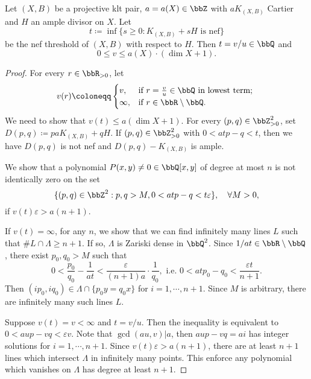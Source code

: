     \begin{theorem}\label{thm: rationality theorem}
        Let \((X,B)\) be a projective klt pair, \(a = a(X) \in \bbZ\) with \(aK_{(X,B)}\) Cartier and \(H\) an ample divisor on \(X\).
        Let 
        \[ t \coloneqq \inf \{s \geq 0: K_{(X,B)} + sH \text{ is nef}\} \]
        be the nef threshold of \((X,B)\) with respect to \(H\).
        Then \(t = v/u \in \bbQ\) and 
        \[ 0 \leq v \leq a(X)\cdot (\dim X + 1). \]
    \end{theorem}
    \begin{proof}
        For every \(r \in \bbR_{> 0}\), let 
        \[ v(r) \coloneqq \begin{cases}
            v, & \text{if } r = \frac{v}{u} \in \bbQ \text{ in lowest term; } \\
            \infty, & \text{if } r \in \bbR\setminus \bbQ.
        \end{cases} \]
        We need to show that \(v(t) \leq a(\dim X + 1)\).
        For every \((p,q) \in \bbZ_{>0}^2\), set \(D(p,q) \coloneqq paK_{(X,B)} + qH\).
        If \((p,q)\in \bbZ^2_{>0}\) with \(0< atp-q < t\), then we have \(D(p,q)\) is not nef and \(D(p,q) - K_{(X,B)}\) is ample.

        \begin{step}\label{step_in_thm:rationality_theorem:polynomial_non-vanishing_on_strips}
            We show that a polynomial \(P(x,y) \neq 0 \in \bbQ[x,y]\) of degree at most \(n\) is not identically zero on the set
            \[  \{(p,q) \in \bbZ^2 : p,q>M, 0< atp-q < t\varepsilon\}, \quad \forall M > 0, \] 
            if \(v(t)\varepsilon > a(n+1)\). 
        \end{step}
        If \(v(t) = \infty\), for any \(n\), we show that we can find infinitely many lines \(L\) such that \(\#L\cap \Lambda \geq n+1\).
        If so, \(\Lambda\) is Zariski dense in \(\bbQ^2\).
        Since \(1/at\in \bbR\setminus \bbQ\), there exist \(p_0,q_0>M\) such that 
        \[ 0 < \frac{p_0}{q_0} - \frac{1}{at} < \frac{\varepsilon}{(n+1)a} \cdot \frac{1}{q_0}, \text{ i.e. } 0<atp_0 - q_0 < \frac{\varepsilon t}{n+1}. \]
        Then \((ip_0,iq_0) \in \Lambda \cap \{p_0y=q_0x\}\) for \(i = 1,\cdots,n+1\).
        Since \(M\) is arbitrary, there are infinitely many such lines \(L\).
        
        Suppose \(v(t) = v < \infty\) and \(t = v/u\).
        Then the inequality is equivalent to \(0 < aup - vq < \varepsilon v\).
        Note that \(\gcd(au,v) | a\), then \(aup - vq = a i\) has integer solutions for \(i = 1,\cdots,n+1\).
        Since \(v(t)\varepsilon > a(n+1)\), there are at least \(n+1\) lines which intersect \(\Lambda\) in infinitely many points.
        This enforce any polynomial which vanishes on \(\Lambda\) has degree at least \(n+1\).


\end{proof}
